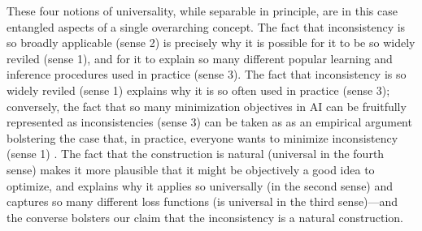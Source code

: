 {These four notions of universality, while separable in principle, are in this case entangled aspects of a single overarching concept.
The fact that inconsistency is so broadly applicable (sense 2) is precisely why it is possible for it to be so widely reviled (sense 1), and for it to explain so many different popular learning and inference procedures used in practice (sense 3). 
The fact that inconsistency is so widely reviled (sense 1) explains why it is so often used in practice (sense 3);
conversely, the fact that so many minimization objectives in AI can be fruitfully represented as inconsistencies
(sense 3)
can be taken as as an empirical argument bolstering the case that, in practice, everyone wants to minimize inconsistency (sense 1)
\unskip. 
The fact that the construction is natural (universal in the fourth sense) makes it more plausible that it might be objectively a good idea to optimize, and explains why it applies so universally (in the second sense) and captures so many different loss functions (is universal in the third sense)---and the converse bolsters our claim that the inconsistency is a natural construction. 


}
